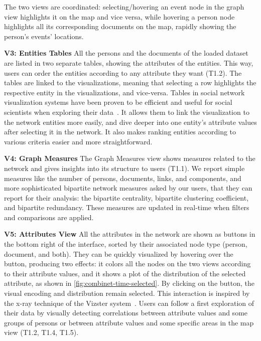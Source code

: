 The two views are coordinated: selecting/hovering an event node in the graph view highlights it on the map and vice versa, while hovering a person node highlights all its corresponding documents on the map, rapidly showing the person's events' locations.

\noindent\textbf{V3: Entities Tables}
All the persons and the documents of the loaded dataset are listed in two separate tables, showing the attributes of the entities.
This way, users can order the entities according to any attribute they want (T1.2).
The tables are linked to the visualizations, meaning that selecting a row highlights the respective entity in the visualizations, and vice-versa.
Tables in social network visualization systems have been proven to be efficient and useful for social scientists when exploring their data~\cite{bezerianosGraphDiceSystemExploring2010}.
It allows them to link the visualization to the network entities more easily, and dive deeper into one entity's attribute values after selecting it in the network.
It also makes ranking entities according to various criteria easier and more straightforward.

\noindent\textbf{V4: Graph Measures}
The Graph Measures view shows measures related to the network and gives insights into its structure to users (T1.1).
We report simple measures like the number of persons, documents, links, and components, and more sophisticated bipartite network measures asked by our users, that they can report for their analysis: the bipartite centrality, bipartite clustering coefficient, and bipartite redundancy. 
These measures are updated in real-time when filters and comparisons are applied.


\noindent\textbf{V5: Attributes View}
All the attributes in the network are shown as buttons in the bottom right of the interface, sorted by their associated node type (person, document, and both).
They can be quickly visualized by hovering over the button, producing two effects: it colors all the nodes on the two views according to their attribute values, and it shows a plot of the distribution of the selected attribute, as shown in \autoref{fig:combinet-time-selected}.
By clicking on the button, the visual encoding and distribution remain selected.
 This interaction is inspired by the x-ray technique of the Vizster system~\cite{heerVizsterVisualizingOnline2005}.
Users can follow a first exploration of their data by visually detecting correlations between attribute values and some groups of persons or between attribute values and some specific areas in the map view (T1.2, T1.4, T1.5).

